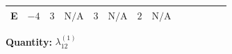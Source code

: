 \documentclass[8pt]{article}
\begin{document}
\begin{landscape}
\begin{longtable}{@{}llcccccc >{\raggedright\arraybackslash}p{0.21\linewidth} >{\raggedright\arraybackslash}p{0.21\linewidth} >{\raggedright\arraybackslash}p{0.21\linewidth}@{}}
\midrule
E & $-4$ & $3$ & $\text{N/A}$ & $3$ & $\text{N/A}$ & $2$ & $\text{N/A}$ & \scriptsize\adjustbox{max width=\linewidth}{$\begin{gathered} +16 {\lambda_{12}^{(A)}}^2\end{gathered}$} & \scriptsize\adjustbox{max width=\linewidth}{$\begin{gathered} +4 {\lambda_{12}^{(\times)}}^2\end{gathered}$} & \scriptsize\adjustbox{max width=\linewidth}{$\begin{gathered} +4 {\lambda_{12}^{(\times)}} {\lambda_{S_1}^{(A)}}\end{gathered}$} \\
\midrule
\bottomrule
\end{longtable}
\clearpage
\noindent\textbf{Quantity: }$\lambda_{12}^{(1)}$\par\smallskip

\end{landscape}
\end{document}
